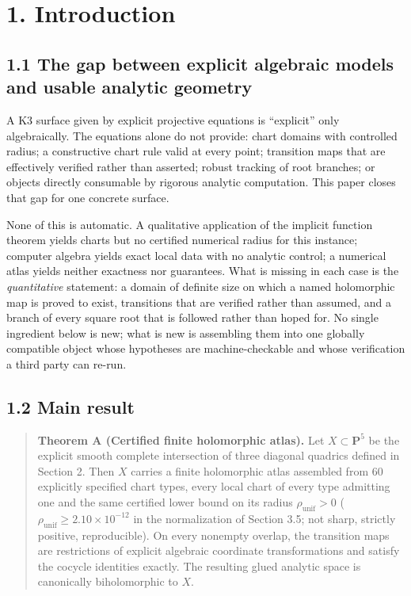 \section{1. Introduction}\label{introduction}

\subsection{1.1 The gap between explicit algebraic models and usable analytic geometry}\label{the-gap-between-explicit-algebraic-models-and-usable-analytic-geometry}

A K3 surface given by explicit projective equations is ``explicit'' only algebraically. The equations alone do not provide: chart domains with controlled radius; a constructive chart rule valid at every point; transition maps that are effectively verified rather than asserted; robust tracking of root branches; or objects directly consumable by rigorous analytic computation. This paper closes that gap for one concrete surface.

None of this is automatic. A qualitative application of the implicit function theorem yields charts but no certified numerical radius for this instance; computer algebra yields exact local data with no analytic control; a numerical atlas yields neither exactness nor guarantees. What is missing in each case is the \emph{quantitative} statement: a domain of definite size on which a named holomorphic map is proved to exist, transitions that are verified rather than assumed, and a branch of every square root that is followed rather than hoped for. No single ingredient below is new; what is new is assembling them into one globally compatible object whose hypotheses are machine-checkable and whose verification a third party can re-run.

\subsection{1.2 Main result}\label{main-result}

\begin{quote}
\textbf{Theorem A (Certified finite holomorphic atlas).} Let \(X \subset \mathbf{P}^5\) be the explicit smooth complete intersection of three diagonal quadrics defined in Section 2. Then \(X\) carries a finite holomorphic atlas assembled from \(60\) explicitly specified chart types, every local chart of every type admitting one and the same certified lower bound on its radius \(\rho_{\mathrm{unif}} > 0\) (\(\rho_{\mathrm{unif}} \ge 2.10 \times 10^{-12}\) in the normalization of Section 3.5; not sharp, strictly positive, reproducible). On every nonempty overlap, the transition maps are restrictions of explicit algebraic coordinate transformations and satisfy the cocycle identities exactly. The resulting glued analytic space is canonically biholomorphic to \(X\).
\end{quote}

